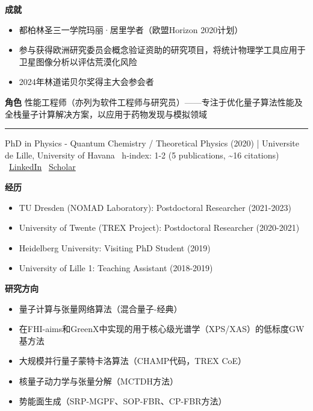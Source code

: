 \par{\footnotesize\color{mainred}\textbf{成就}}
\begin{itemize}[leftmargin=1.2em,itemsep=0pt,topsep=0pt]
\item {\footnotesize 都柏林圣三一学院玛丽·居里学者（欧盟Horizon 2020计划）}
\item {\footnotesize 参与获得欧洲研究委员会概念验证资助的研究项目，将统计物理学工具应用于卫星图像分析以评估荒漠化风险}
\item {\footnotesize 2024年林道诺贝尔奖得主大会参会者}
\end{itemize}
\par{\footnotesize\color{mainred}\textbf{角色}} {\footnotesize 性能工程师（亦列为软件工程师与研究员）——专注于优化量子算法性能及全栈量子计算解决方案，以应用于药物发现与模拟领域}
\vspace{2pt}\hrule\vspace{2pt}
\vspace{4pt}
\par{\footnotesize\color{graytext}PhD in Physics - Quantum Chemistry / Theoretical Physics (2020) | Universite de Lille, University of Havana \textbar\  h-index: 1-2 (5 publications, \textasciitilde{}16 citations) \textbar\  \href{https://www.linkedin.com/in/rpanades/}{LinkedIn} \textbar\  \href{https://scholar.google.com/citations?user=IMWuq6wAAAAJ&hl}{Scholar}}
\par{\footnotesize\color{mainred}\textbf{经历}}
\begin{itemize}[leftmargin=1.2em,itemsep=0pt,topsep=0pt]
\item {\footnotesize TU Dresden (NOMAD Laboratory): Postdoctoral Researcher (2021-2023)}
\item {\footnotesize University of Twente (TREX Project): Postdoctoral Researcher (2020-2021)}
\item {\footnotesize Heidelberg University: Visiting PhD Student (2019)}
\item {\footnotesize University of Lille 1: Teaching Assistant (2018-2019)}
\end{itemize}
\par{\footnotesize\color{mainred}\textbf{研究方向}}
\begin{itemize}[leftmargin=1.2em,itemsep=0pt,topsep=0pt]
\item {\footnotesize 量子计算与张量网络算法（混合量子-经典）}
\item {\footnotesize 在FHI-aims和GreenX中实现的用于核心级光谱学（XPS/XAS）的低标度GW基方法}
\item {\footnotesize 大规模并行量子蒙特卡洛算法（CHAMP代码，TREX CoE）}
\item {\footnotesize 核量子动力学与张量分解（MCTDH方法）}
\item {\footnotesize 势能面生成（SRP-MGPF、SOP-FBR、CP-FBR方法）}
\end{itemize}
